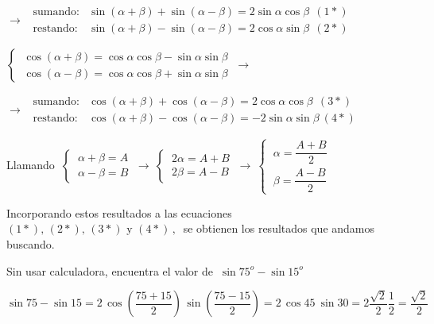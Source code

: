 \hspace{5cm} $\to \ \  \begin{array}{ll}
 	\text{sumando:}&\sin(\alpha+\beta)+\sin(\alpha-\beta)=2\sin\alpha \cos \beta     \ \ (1*)\\ \text{restando:}&\sin(\alpha+\beta)-\sin(\alpha-\beta)=2\cos\alpha \sin \beta  \ \ (2*)
 \end{array}$
                                         

 
\vspace{3mm} $\begin{cases}
\ \cos(\alpha+\beta)=\cos \alpha \cos \beta - \sin \alpha \sin \beta \\	
\ \cos(\alpha-\beta)=\cos \alpha \cos \beta + \sin \alpha \sin \beta  
\end{cases} \ \to \ $

\hspace{5cm} $\to \ \  \begin{array}{ll}
 	\text{sumando:}&\cos(\alpha+\beta)+\cos(\alpha-\beta)=2\cos\alpha \cos \beta \ \ (3*) \\ \text{restando:}&\cos(\alpha+\beta)-\cos (\alpha-\beta)=-2\sin\alpha \sin \beta \ (4*)
 \end{array}$
 
\vspace{3mm} Llamando $\ \begin{cases} \ \alpha + \beta =A\\ \ \alpha - \beta=B \end{cases} \ \to \ \begin{cases} \ 2\alpha=A+B \\ \ 2\beta=A-B \end{cases} \ \to \ \begin{cases} \ \alpha= \dfrac{A+B}{2} \\   \ \beta= \dfrac{A-B}{2} \end{cases}$


Incorporando estos resultados a las ecuaciones $(1*),\, (2*),\, (3*) \text{ y }  
 (4*)\, , \ $ se obtienen los resultados que andamos buscando. \QED

\vspace{5mm} 
\begin{miejemplo}

Sin usar calculadora, encuentra el valor de $\ \sin 75^o-\sin 15^o$	

\vspace{5mm}
$\sin 75-\sin 15= 2 \, \cos \left( \dfrac{75+15}{2} \right) \, \sin \left( \dfrac{75-15}{2} \right) = 2\, \cos 45 \ \sin 30 = 2\dfrac{\sqrt{2}}{2}\dfrac 12=\dfrac {\sqrt{2}}{2}$
\end{miejemplo}


